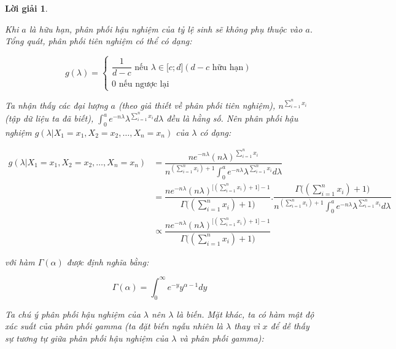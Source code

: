 \documentclass[14pt, a4paper]{article}
\theoremstyle{sltheorem}
\theoremstyle{soltheorem}
\newtheorem*{loigiai}{Lời giải}
\begin{document}
\begin{loigiai}
\begin{enumerate}
\begin{enumerate}[label=(\alph*)]
            Khi $a$ là hữu hạn, phân phối hậu nghiệm của tỷ lệ sinh sẽ không phụ thuộc vào $a$.
            Tổng quát, phân phối tiên nghiệm có thể có dạng:


            \begin{equation*}
                g(\lambda) = \begin{cases}
                    \dfrac{1}{d - c} \text{ nếu } \lambda \in \lbrack c; d\rbrack (d-c \text{ hữu hạn}) \\
                    0 \text{ nếu ngược lại}
                \end{cases}
            \end{equation*}

            Ta nhận thấy các đại lượng $a$ (theo giả thiết về phân phối tiên nghiệm), $n^{\sum_{i=1}^n x_i}$  (tập dữ liệu ta đã biết), $\displaystyle\int_{0}^a e^{-n\lambda} \lambda^{\sum_{i=1}^n x_i}d\lambda$ đều là hằng số.
            Nên phân phối hậu nghiệm $g(\lambda \vert X_1 =x_1, X_2=x_2, \dots, X_n=x_n)$ của $\lambda$ có dạng:

            \begin{equation*}
                \begin{aligned}
                    g(\lambda \vert X_1 =x_1, X_2=x_2, \dots, X_n=x_n) &= \dfrac{n e^{-n\lambda}(n\lambda)^{\sum_{i=1}^n x_i}}{n^{(\sum_{i=1}^n x_i) + 1}\displaystyle\int_{0}^a e^{-n\lambda} \lambda^{\sum_{i=1}^n x_i}d\lambda} \\
                    &= \dfrac{n e^{-n\lambda}(n\lambda)^{\big\lbrack(\sum_{i=1}^n x_i) + 1\big\rbrack - 1}}{\Gamma\big((\sum_{i=1}^n x_i) + 1\big)}.\dfrac{\Gamma\big((\sum_{i=1}^n x_i) + 1\big)}{n^{(\sum_{i=1}^n x_i) + 1}\displaystyle\int_{0}^a e^{-n\lambda} \lambda^{\sum_{i=1}^n x_i}d\lambda} \\
                    &\propto \dfrac{n e^{-n\lambda}(n\lambda)^{\big\lbrack(\sum_{i=1}^n x_i) + 1\big\rbrack - 1}}{\Gamma\big((\sum_{i=1}^n x_i) + 1\big)}
                \end{aligned}
            \end{equation*}

            với hàm $\Gamma(\alpha)$ được định nghĩa bằng:

            \begin{equation*}
                \Gamma(\alpha) = \int_{0}^{\infty} e^{-y} y^{\alpha - 1} dy
            \end{equation*}

            Ta chú ý phân phối hậu nghiệm của $\lambda$ nên $\lambda$ là biến.
            Mặt khác, ta có hàm mật độ xác suất của phân phối gamma (ta đặt biến ngẫu nhiên là $\lambda$ thay vì $x$ để dễ thấy sự tương tự giữa phân phối hậu nghiệm của $\lambda$ và phân phối gamma):


\end{enumerate}
\end{enumerate}
\end{loigiai}
\end{document}
